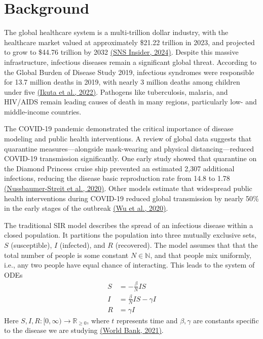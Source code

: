 \documentclass[12pt]{article}
\begin{document}
\section{Background}
The global healthcare system is a multi-trillion dollar industry, with the healthcare market valued at approximately \$21.22 trillion in 2023, and projected to grow to \$44.76 trillion by 2032 \href{https://www.globenewswire.com/news-release/2024/08/01/2923001/0/en/Healthcare-Market-Size-Worth-US-44-760-73-Billion-By-2032-Continuous-Advancements-in-Biotechnology-Pharmaceuticals-Propels-Growth-Research-by-SNS-Insider.html}{(SNS Insider, 2024)}. Despite this massive infrastructure, infectious diseases remain a significant global threat. According to the Global Burden of Disease Study 2019, infectious syndromes were responsible for 13.7 million deaths in 2019, with nearly 3 million deaths among children under five \href{https://www.thelancet.com/journals/lancet/article/PIIS0140-6736(22)02185-7/fulltext}{(Ikuta et al., 2022)}. Pathogens like tuberculosis, malaria, and HIV/AIDS remain leading causes of death in many regions, particularly low- and middle-income countries.

The COVID-19 pandemic demonstrated the critical importance of disease modeling and public health interventions. A review of global data suggests that quarantine measures—alongside mask-wearing and physical distancing—reduced COVID-19 transmission significantly. One early study showed that quarantine on the Diamond Princess cruise ship prevented an estimated 2,307 additional infections, reducing the disease basic reproduction rate from 14.8 to 1.78 \href{https://www.ncbi.nlm.nih.gov/pmc/articles/PMC7141753/}{(Nussbaumer-Streit et al., 2020)}. Other models estimate that widespread public health interventions during COVID-19 reduced global transmission by nearly 50\% in the early stages of the outbreak \href{https://www.nature.com/articles/s41591-020-0822-7}{(Wu et al., 2020)}.

The traditional SIR model describes the spread of an infectious disease within a closed population. It partitions the population into three mutually exclusive sets, $S$ (susceptible), $I$ (infected), and $R$ (recovered). The model assumes that that the total number of people is some constant $N \in \mathbb{N}$, and that people mix uniformly, i.e., any two people have equal chance of interacting. This leads to the system of ODEs
\begin{align*}
    S &= -\frac{\beta}{N}IS\\
    I &= \frac{\beta}{N}IS - \gamma I\\
    R &= \gamma I
\end{align*}
Here $S, I, R: [0, \infty) \longrightarrow \mathbb{R}_{\geq 0}$, where $t$ represents time and $\beta, \gamma$ are constants specific to the disease we are studying \href{https://documents1.worldbank.org/curated/en/888341625223820901/pdf/An-Introduction-to-Deterministic-Infectious-Disease-Models.pdf}{(World Bank, 2021)}.
\end{document}
